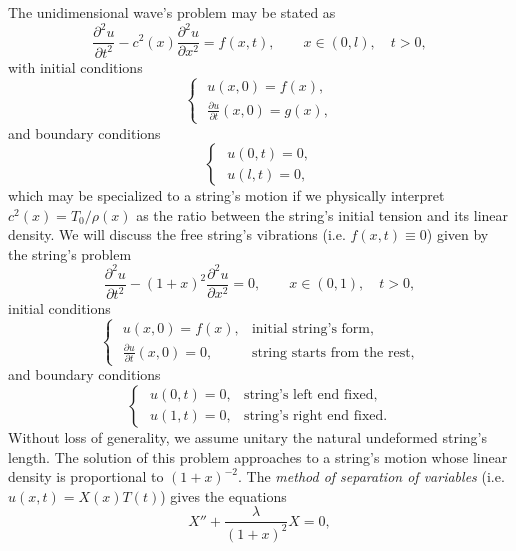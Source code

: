 \documentclass[12pt]{article}
\begin{document}
The unidimensional wave's problem may be stated as
\begin{equation*}
\frac{\partial^2u}{\partial t^2}-c^2(x)\frac{\partial^2u}{\partial x^2}=f(x,t), \qquad x\in(0,l),\quad t>0,
\end{equation*}
with initial conditions
\begin{equation*}
\begin{cases}
\,\, u(x,0)=f(x), \\
\,\, \frac{\partial u}{\partial t}(x,0)=g(x),
\end{cases}
\end{equation*}
and boundary conditions
\begin{equation*}
\begin{cases}
\,\, u(0,t)=0, \\
\,\, u(l,t)=0,
\end{cases}
\end{equation*}
which may be specialized to a string's motion if we physically interpret $c^2(x)=T_0/\rho(x)$ as the ratio between the string's initial tension and its linear density. We will discuss the free string's vibrations (i.e. $f(x,t)\equiv 0$) given by the string's problem
\begin{equation}
\frac{\partial^2 u}{\partial t^2}-(1+x)^2\frac{\partial^2 u}{\partial x^2}=0, \qquad x\in (0,1), \quad t>0,
\end{equation}
initial conditions
\begin{equation*}
\begin{cases}
\,\, u(x,0)=f(x), & \textrm{initial string's form}, \\
\,\, \frac{\partial u}{\partial t}(x,0)=0, & \textrm{string starts from the rest},
\end{cases}
\end{equation*} 
and boundary conditions
\begin{equation*}
\begin{cases}
\,\, u(0,t)=0, & \textrm{string's left end fixed}, \\
\,\, u(1,t)=0, & \textrm{string's right end fixed}.
\end{cases}
\end{equation*}
Without loss of generality, we assume unitary the natural undeformed string's length. The solution of this problem approaches to a string's motion whose linear density is proportional to $(1+x)^{-2}$. The \emph{method of separation of variables} (i.e. $u(x,t)=X(x)T(t)$) gives the equations
\begin{equation}
X''+\frac{\lambda}{(1+x)^2}X=0,
\end{equation}
\end{document}
